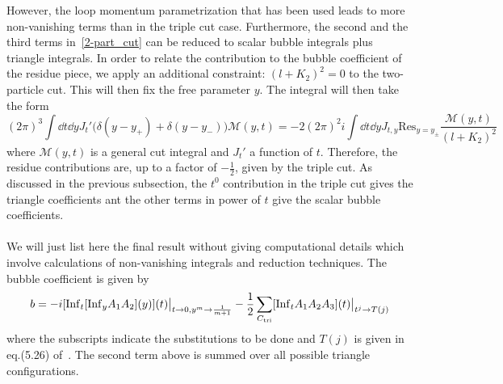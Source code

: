 However, the loop momentum parametrization that has been used leads to more non-vanishing terms than in the triple cut case. 
Furthermore, the second and the third terms in~\cref{2-part_cut} can be reduced to scalar bubble integrals plus triangle integrals. 
In order to relate the contribution to the bubble coefficient of the residue piece, we apply an additional constraint: $(l+K_2)^2=0$ to the two-particle cut.
This will then fix the free parameter $y$.
The integral will then take the form
\begin{equation}
(2\pi)^3\int \dd t \dd y J_t'\big(\delta(y-y_+) + \delta(y-y_-)\big) \mathcal{M}(y,t) = -2(2\pi)^2 i \int \dd t \dd y J_{t,y}\mathrm{Res}_{y = y_{\pm}}\frac{\mathcal{M}(y,t)}{(l+K_2)^2}
\end{equation}
where $\mathcal{M}(y,t)$ is a general cut integral and $J_t'$ a function of $t$.
Therefore, the residue contributions are, up to a factor of $-\frac{1}{2}$, given by the triple cut.
As discussed in the previous subsection, the $t^0$ contribution in the triple cut gives the triangle coefficients ant the other terms in power of $t$ give the scalar bubble coefficients.
\\\\
We will just list here the final result without giving computational details which involve calculations of non-vanishing integrals and reduction techniques.
The bubble coefficient is given by
\begin{equation}
b = -i[\mathrm{Inf}_t[\mathrm{Inf}_y A_1 A_2](y)](t)\big|_{t\rightarrow 0 , y^m\rightarrow \frac{1}{m+1}}
-\frac{1}{2}\sum_{C_{\mathrm{tri}}}[\mathrm{Inf}_t A_1A_2A_3](t)\big|_{t^j\rightarrow T(j)}
\end{equation}
where the subscripts indicate the substitutions to be done and $T(j)$ is given in eq.(5.26) of~\cite{Forde:2007mi}. 
The second term above is summed over all possible triangle configurations.
\\\\
\iffalse
As an example, let us cite briefly how the two-mass linear triangle
\begin{equation}
(2\pi)^2\int\dd^4 l \prod_{i=0}^1\delta(l_i^2)\frac{\langle K_2|\slashed{l}|K_1]}{(l+K_2)^2}
\end{equation}
is treated in~\cite{Forde:2007mi}:
\begin{enumerate}
\item Do a two-particle cut. We will then get two terms in the integrand: one in $y^0$ and a residual term. The term in $y^0$ gives us a contribution to the bubble coefficients; while the residual term means that a triple cut is needed to get the contributions to the bubble and triangle contributions.
%
\item Apply a triple cut. There will be a term in $t$ if we choose the parametrization introduced previously, which encodes information on the bubble coefficients.
%
\item This term then requires the knowledge of $\int \dd t J_t' t$, which can be re-expressed in terms of our parametrization. Then, apply the Passarino-Veltman reduction to get the relationsship between $\int \dd tJ_t' t$ and the cut bubble $B_0^{\mathrm{cut}(K_1^2)}$
\end{enumerate}
\fi
%
%
%
